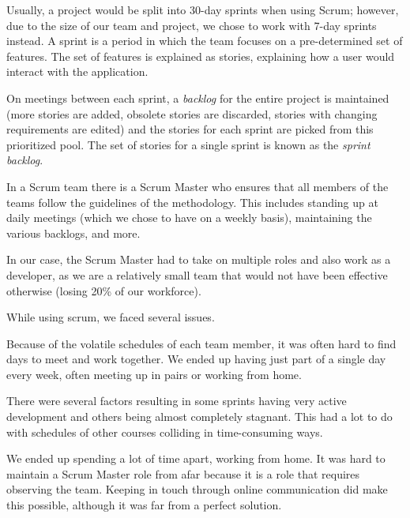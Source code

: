 Usually, a project would be split into 30-day sprints when using Scrum; however, due to the size of
our team and project, we chose to work with 7-day sprints instead. A sprint is a period in which the
team focuses on a pre-determined set of features. The set of features is explained as stories,
explaining how a user would interact with the application.

On meetings between each sprint, a \emph{backlog} for the entire project is maintained (more stories are
added, obsolete stories are discarded, stories with changing requirements are edited) and the stories
for each sprint are picked from this prioritized pool. The set of stories for a single sprint is known
as the \emph{sprint backlog}.

In a Scrum team there is a Scrum Master who ensures that all members of the teams follow the guidelines
of the methodology. This includes standing up at daily meetings (which we chose to have on a weekly basis),
maintaining the various backlogs, and more.

In our case, the Scrum Master had to take on multiple roles and also work as a developer, as we are a relatively
small team that would not have been effective otherwise (losing 20\% of our workforce).

While using scrum, we faced several issues.

Because of the volatile schedules of each team member, it was often hard to find days to meet and work
together. We ended up having just part of a single day every week, often meeting up in pairs or working
from home.

There were several factors resulting in some sprints having very active development and others being almost
completely stagnant. This had a lot to do with schedules of other courses colliding in
time-consuming ways.

We ended up spending a lot of time apart, working from home. It was hard to maintain a Scrum Master role from
afar because it is a role that requires observing the team. Keeping in touch through online communication did
make this possible, although it was far from a perfect solution.
